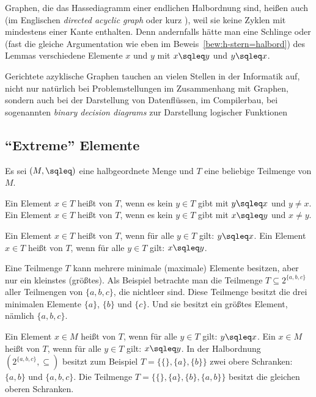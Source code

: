 Graphen, die das Hassediagramm einer endlichen Halbordnung sind,
heißen auch  (im
Englischen \emph{directed acyclic graph} oder kurz
), weil sie keine Zyklen mit mindestens einer
Kante enthalten. Denn andernfalls hätte man eine Schlinge oder (fast
die gleiche Argumentation wie eben im
Beweis~\ref{bew:h-stern=halbord}) des Lemmas verschiedene Elemente $x$
und $y$ mit $x\sqleq y$ und $y\sqleq x$. 

Gerichtete azyklische Graphen tauchen an vielen Stellen in der
Informatik auf, nicht nur natürlich bei Problemstellungen im
Zusammenhang mit Graphen, sondern \zB auch bei der Darstellung von
Datenflüssen, im Compilerbau, bei sogenannten \emph{binary decision
  diagrams} zur Darstellung logischer Funktionen \usw

\Tut\subsection{"`Extreme"' Elemente}
\label{subsub:extrem-halb-ord}

Es sei $(M,\sqleq)$ eine halbgeordnete Menge und $T$ eine beliebige
Teilmenge von $M$.

Ein Element $x\in T$ heißt  von
$T$, wenn es kein $y\in T$ gibt mit $y\sqleq
x$ und $y\not=x$.  Ein Element $x\in T$ heißt  von $T$, wenn es kein $y\in T$
gibt mit $x\sqleq y$ und $x\not=y$.

Ein Element $x\in T$ heißt  von
$T$, wenn für alle $y\in T$ gilt: $y\sqleq x$.  Ein
Element $x\in T$ heißt  von
$T$, wenn für alle $y\in T$ gilt: $x\sqleq y$.

Eine Teilmenge $T$ kann mehrere minimale (\bzw maximale) Elemente
besitzen, aber nur ein kleinstes (\bzw größtes). Als Beispiel
betrachte man die Teilmenge $T\subseteq 2^{\{a,b,c\}}$ aller Teilmengen
  von $\{a,b,c\}$, die nichtleer sind. Diese Teilmenge besitzt die
  drei minimalen Elemente $\{a\}$, $\{b\}$ und $\{c\}$. Und sie
besitzt ein größtes Element, nämlich $\{a,b,c\}$.

Ein Element $x\in M$ heißt  von
$T$, wenn für alle $y\in
T$ gilt: $y\sqleq x$. Ein $x\in M$ heißt  von
$T$, wenn für alle $y\in
T$ gilt: $x\sqleq y$.  In der Halbordnung $(2^{\{a,b,c\}}, \subseteq)$
besitzt zum Beispiel $T=\{ \{\}, \{a\}, \{b\} \}$ zwei obere
Schranken: $\{a,b\}$ und $\{a,b,c\}$. Die Teilmenge $T=\{ \{\}, \{a\},
\{b\}, \{a,b\} \}$ besitzt die gleichen oberen Schranken.

